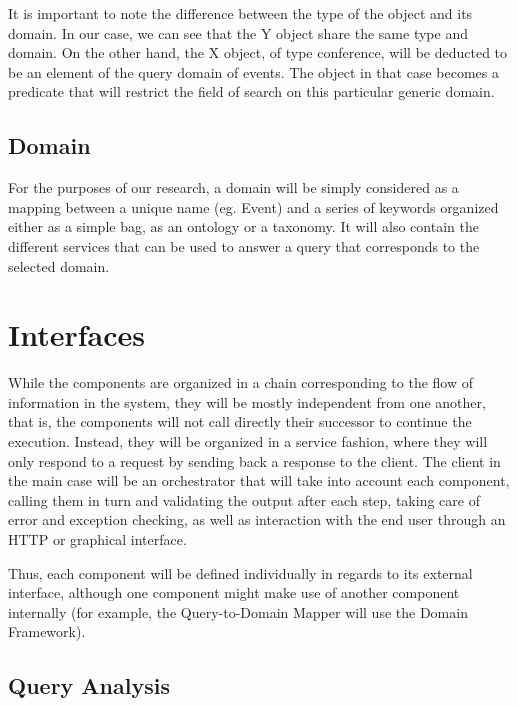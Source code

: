 It is important to note the difference between the type of the object and its domain. In our case, we can see that the Y object share the same type and domain. On the other hand, the X object, of type conference, will be deducted to be an element of the query domain of events. The object in that case becomes a predicate that will restrict the field of search on this particular generic domain.


\subsection{Domain} %
\label{sub:domain}

For the purposes of our research, a domain will be simply considered as a mapping between a unique name (eg. Event) and a series of keywords organized either as a simple bag, as an ontology or a taxonomy. It will also contain the different services that can be used to answer a query that corresponds to the selected domain.


\section{Interfaces} %
\label{sec:interfaces}

While the components are organized in a chain corresponding to the flow of information in the system, they will be mostly independent from one another, that is, the components will not call directly their successor to continue the execution. Instead, they will be organized in a service fashion, where they will only respond to a request by sending back a response to the client. The client in the main case will be an orchestrator that will take into account each component, calling them in turn and validating the output after each step, taking care of error and exception checking, as well as interaction with the end user through an HTTP or graphical interface.

Thus, each component will be defined individually in regards to its external interface, although one component might make use of another component internally (for example, the Query-to-Domain Mapper will use the Domain Framework).

\subsection{Query Analysis} %
\label{sub:query_analysis_dm}

